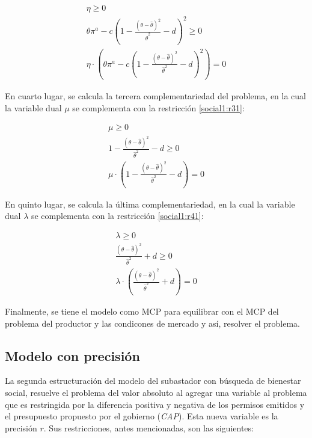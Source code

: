 \begin{footnotesize}
\begin{align}
    \eta \geq 0 \\
   \theta \pi^a - c(1-\frac{(\theta - \hat{\theta})^2}{\hat{\theta}^2}-d)^2 \geq 0\\
    \eta \cdot (\theta \pi^a - c(1-\frac{(\theta - \hat{\theta})^2}{\hat{\theta}^2}-d)^2)=0
\end{align}
\end{footnotesize}

En cuarto lugar, se calcula la tercera complementariedad del problema, en la cual la variable dual $\mu$ se complementa con la restricción \ref{social1:r31}:

\begin{footnotesize}
\begin{align}
    \mu \geq 0 \\
  1 - \frac{(\theta-\hat{\theta})^2}{\hat{\theta}^2} - d  \geq 0\\
    \mu \cdot (1 - \frac{(\theta-\hat{\theta})^2}{\hat{\theta}^2} - d )=0
\end{align}
\end{footnotesize}

En quinto lugar, se calcula la última complementariedad, en la cual la variable dual $\lambda$ se complementa con la restricción \ref{social1:r41}:

\begin{footnotesize}
\begin{align}
    \lambda \geq 0 \\
  \frac{(\theta-\hat{\theta})^2}{\hat{\theta}^2 }+ d \geq 0 \\
    \lambda \cdot (\frac{(\theta-\hat{\theta})^2}{\hat{\theta}^2 }+ d)=0
\end{align}
\end{footnotesize}

Finalmente, se tiene el modelo como MCP para equilibrar con el MCP del problema del productor y las condicones de mercado y así, resolver el problema.


\subsection{Modelo con precisión}\label{modeloconprecision}

La segunda estructuración del modelo del subastador con búsqueda de bienestar social, resuelve el problema del valor absoluto al agregar una variable al problema que es restringida por la diferencia positiva y negativa de los permisos emitidos y el presupuesto propuesto por el gobierno (\textit{CAP}). Esta nueva variable es la precisión $r$. Sus restricciones, antes mencionadas, son las siguientes: 

